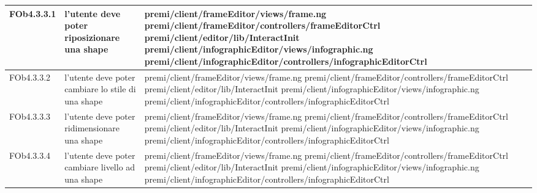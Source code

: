 \begin{longtable}{|l|p{5cm}|p{7cm}|}
\hline
FOb4.3.3.1 & l'utente deve poter riposizionare una shape & \hspace{0pt}premi/client/frameEditor/views/frame.ng \linebreak \linebreak premi/client/frameEditor/controllers/frameEditorCtrl \linebreak \linebreak premi/client/editor/lib/InteractInit \linebreak \linebreak premi/client/infographicEditor/views/infographic.ng \linebreak \linebreak premi/client/infographicEditor/controllers/infographicEditorCtrl \\
\hline
FOb4.3.3.2 & l'utente deve poter cambiare lo stile di una shape & \hspace{0pt}premi/client/frameEditor/views/frame.ng \linebreak \linebreak premi/client/frameEditor/controllers/frameEditorCtrl \linebreak \linebreak premi/client/editor/lib/InteractInit \linebreak \linebreak premi/client/infographicEditor/views/infographic.ng \linebreak \linebreak premi/client/infographicEditor/controllers/infographicEditorCtrl \\
\hline
FOb4.3.3.3 & l'utente deve poter ridimensionare una shape & \hspace{0pt}premi/client/frameEditor/views/frame.ng \linebreak \linebreak premi/client/frameEditor/controllers/frameEditorCtrl \linebreak \linebreak premi/client/editor/lib/InteractInit \linebreak \linebreak premi/client/infographicEditor/views/infographic.ng \linebreak \linebreak premi/client/infographicEditor/controllers/infographicEditorCtrl \\
\hline
FOb4.3.3.4 & l'utente deve poter cambiare livello ad una shape & \hspace{0pt}premi/client/frameEditor/views/frame.ng \linebreak \linebreak premi/client/frameEditor/controllers/frameEditorCtrl \linebreak \linebreak premi/client/editor/lib/InteractInit \linebreak \linebreak premi/client/infographicEditor/views/infographic.ng \linebreak \linebreak premi/client/infographicEditor/controllers/infographicEditorCtrl \\

\end{longtable}
